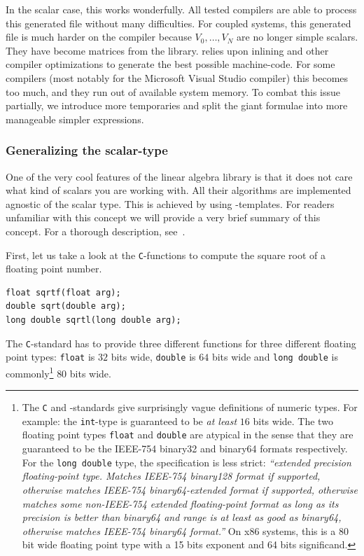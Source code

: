 In the scalar case, this works wonderfully. All tested compilers are able to process this generated file without many difficulties. For coupled systems, this generated file is much harder on the compiler because $V_0, \dots, V_N$ are no longer simple scalars. They have become matrices from the \Eigen{} library. \Eigen{} relies upon inlining and other compiler optimizations to generate the best possible machine-code. For some compilers (most notably for the Microsoft Visual Studio compiler) this becomes too much, and they run out of available system memory. To combat this issue partially, we introduce more temporaries and split the giant formulae into more manageable simpler expressions.

\subsubsection{Generalizing the scalar-type}\label{sec:c2_generalizing_scalar}

One of the very cool features of the linear algebra library \Eigen{} is that it does not care what kind of scalars you are working with. All their algorithms are implemented agnostic of the scalar type. This is achieved by using \cpp{}-templates. For readers unfamiliar with this concept we will provide a very brief summary of this concept. For a thorough description, see~\cite[chapter~23]{stroustrup_programming_2013}.

First, let us take a look at the \texttt{C}-functions to compute the square root of a floating point number.
\begin{verbatim}
float sqrtf(float arg);
double sqrt(double arg);
long double sqrtl(long double arg);
\end{verbatim}

The \texttt{C}-standard has to provide three different functions for three different floating point types: \texttt{float} is $32$ bits wide, \texttt{double} is $64$ bits wide and \texttt{long double} is commonly\footnote{The \texttt{C} and \cpp{}-standards give surprisingly vague definitions of numeric types. For example: the \texttt{int}-type is guaranteed to be \emph{at least} $16$ bits wide. The two floating point types \texttt{float} and \texttt{double} are atypical in the sense that they are guaranteed to be the IEEE-754 binary32 and binary64 formats respectively. For the \texttt{long double} type, the specification is less strict: \emph{``extended precision floating-point type. Matches IEEE-754 binary128 format if supported, otherwise matches IEEE-754 binary64-extended format if supported, otherwise matches some non-IEEE-754 extended floating-point format as long as its precision is better than binary64 and range is at least as good as binary64, otherwise matches IEEE-754 binary64 format.''} On x86 systems, this is a $80$ bit wide floating point type with a 15 bits exponent and 64 bits significand.} $80$ bits wide.

